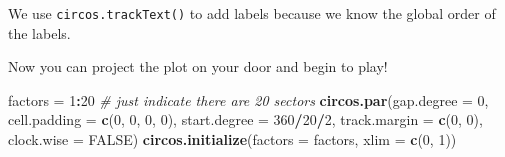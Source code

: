 \documentclass[]{book}
\newenvironment{Shaded}{\begin{snugshade}}{\end{snugshade}}
\newcommand{\KeywordTok}[1]{\textcolor[rgb]{0.13,0.29,0.53}{\textbf{#1}}}
\newcommand{\DataTypeTok}[1]{\textcolor[rgb]{0.13,0.29,0.53}{#1}}
\newcommand{\DecValTok}[1]{\textcolor[rgb]{0.00,0.00,0.81}{#1}}
\newcommand{\StringTok}[1]{\textcolor[rgb]{0.31,0.60,0.02}{#1}}
\newcommand{\CommentTok}[1]{\textcolor[rgb]{0.56,0.35,0.01}{\textit{#1}}}
\newcommand{\OtherTok}[1]{\textcolor[rgb]{0.56,0.35,0.01}{#1}}
\newcommand{\OperatorTok}[1]{\textcolor[rgb]{0.81,0.36,0.00}{\textbf{#1}}}
\newcommand{\NormalTok}[1]{#1}
\theoremstyle{definition}
\theoremstyle{definition}
\theoremstyle{remark}
\begin{document}
We use \texttt{circos.trackText()} to add labels because we know the
global order of the labels.

Now you can project the plot on your door and begin to play!

\begin{Shaded}
\begin{Highlighting}[]
\NormalTok{factors =}\StringTok{ }\DecValTok{1}\OperatorTok{:}\DecValTok{20}  \CommentTok{# just indicate there are 20 sectors}
\KeywordTok{circos.par}\NormalTok{(}\DataTypeTok{gap.degree =} \DecValTok{0}\NormalTok{, }\DataTypeTok{cell.padding =} \KeywordTok{c}\NormalTok{(}\DecValTok{0}\NormalTok{, }\DecValTok{0}\NormalTok{, }\DecValTok{0}\NormalTok{, }\DecValTok{0}\NormalTok{),}
    \DataTypeTok{start.degree =} \DecValTok{360}\OperatorTok{/}\DecValTok{20}\OperatorTok{/}\DecValTok{2}\NormalTok{, }\DataTypeTok{track.margin =} \KeywordTok{c}\NormalTok{(}\DecValTok{0}\NormalTok{, }\DecValTok{0}\NormalTok{), }\DataTypeTok{clock.wise =} \OtherTok{FALSE}\NormalTok{)}
\KeywordTok{circos.initialize}\NormalTok{(}\DataTypeTok{factors =}\NormalTok{ factors, }\DataTypeTok{xlim =} \KeywordTok{c}\NormalTok{(}\DecValTok{0}\NormalTok{, }\DecValTok{1}\NormalTok{))}


\end{Highlighting}
\end{Shaded}
\end{document}
